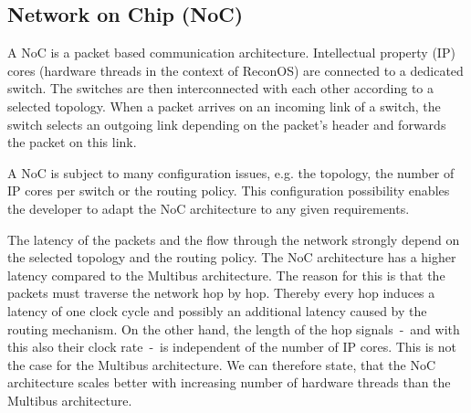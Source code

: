 \subsection{\label{evaluation:noc}Network on Chip (NoC)}
A NoC is a packet based communication architecture. Intellectual property (IP) cores (hardware threads in the context of ReconOS) are connected to a dedicated switch. The switches are then interconnected with each other according to a selected topology. When a packet arrives on an incoming link of a switch, the switch selects an outgoing link depending on the packet's header and forwards the packet on this link.

A NoC is subject to many configuration issues, e.g. the topology, the number of IP cores per switch or the routing policy. This configuration possibility enables the developer to adapt the NoC architecture to any given requirements.

The latency of the packets and the flow through the network strongly depend on the selected topology and the routing policy. The NoC architecture has a higher latency compared to the Multibus architecture. The reason for this is that the packets must traverse the network hop by hop. Thereby every hop induces a latency of one clock cycle and possibly an additional latency caused by the routing mechanism. On the other hand, the length of the hop signals~-~and with this also their clock rate~-~is independent of the number of IP cores. This is not the case for the Multibus architecture. We can therefore state, that the NoC architecture scales better with increasing number of hardware threads than the Multibus architecture.

